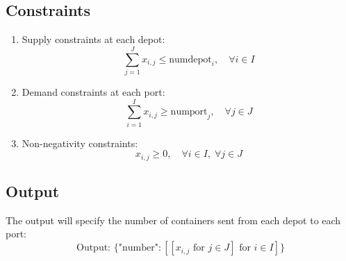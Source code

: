 \documentclass{article}
\begin{document}
\subsection*{Constraints}
\begin{enumerate}
    \item Supply constraints at each depot:
    \[
    \sum_{j=1}^{J} x_{i,j} \leq \text{numdepot}_i, \quad \forall i \in I
    \]
    
    \item Demand constraints at each port:
    \[
    \sum_{i=1}^{I} x_{i,j} \geq \text{numport}_j, \quad \forall j \in J
    \]
    
    \item Non-negativity constraints:
    \[
    x_{i,j} \geq 0, \quad \forall i \in I, \; \forall j \in J
    \]
\end{enumerate}

\subsection*{Output}
The output will specify the number of containers sent from each depot to each port:
\[
\text{Output: } \{ \text{"number"}: [[x_{i,j} \text{ for } j \in J] \text{ for } i \in I] \}
\]
\end{document}
